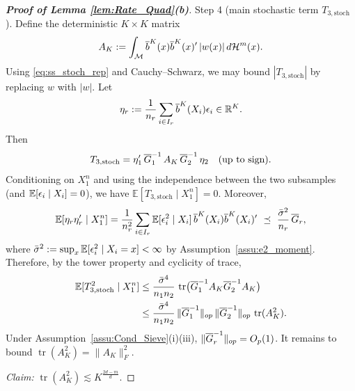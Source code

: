 \documentclass[12pt,american]{article}
\newcommand{\cH}{\mathcal{H}}
\DeclareMathOperator{\tr}{tr}
\theoremstyle{definition}
\theoremstyle{plain}
\theoremstyle{definition}
\theoremstyle{plain}
\theoremstyle{plain}
\theoremstyle{plain}
\theoremstyle{plain}
\theoremstyle{plain}
\newcommand{\R}{\mathbb{R}}
\newcommand{\E}{\mathbb{E}}
\begin{document}
\begin{proof}[\textbf{Proof of Lemma \ref{lem:Rate_Quad}(b)}]
\smallskip
\noindent Step 4 (main stochastic term $T_{3,\mathrm{stoch}}$).
Define the deterministic $K\times K$ matrix
\[
A_K:=\int_{\cM}\ol b^K(x)\ol b^K(x)'\,|w(x)|\,d\cH^m(x).
\]
Using \eqref{eq:ss_stoch_rep} and Cauchy--Schwarz, we may bound $|T_{3,\mathrm{stoch}}|$ by replacing $w$ with $|w|$.
Let
\[
\eta_r:=\frac1{n_r}\sum_{i\in I_r}\ol b^K(X_i)\e_i\in\R^{K}.
\]
Then
\begin{equation}
\label{eq:ss_T3stoch_matrix}
T_{3,\mathrm{stoch}}=\eta_1'\,\overline{G}_1^{-1}\,A_K\,\overline{G}_2^{-1}\,\eta_2\quad\text{(up to sign)}.
\end{equation}
Conditioning on $X_1^n$ and using the independence between the two subsamples (and $\E[\e_i\mid X_i]=0$), we have $\E[T_{3,\mathrm{stoch}}\mid X_1^n]=0$.
Moreover,
\[
\E[\eta_r\eta_r'\mid X_1^n]
=\frac1{n_r^2}\sum_{i\in I_r}\E[\e_i^2\mid X_i]\,\ol b^K(X_i)\ol b^K(X_i)'
\ \preceq\ \frac{\bar\s^2}{n_r}\,\ol G_r,
\]
where $\bar\s^2:=\sup_x\E[\e_i^2\mid X_i=x]<\infty$ by Assumption~\ref{assu:e2_moment}.
Therefore, by the tower property and cyclicity of trace,
\begin{align*}
\E[T_{3,\mathrm{stoch}}^2\mid X_1^n]
&\le \frac{\bar\s^4}{n_1n_2}\,\tr\!\big(\ol G_1^{-1}A_K\ol G_2^{-1}A_K\big)\\
&\le \frac{\bar\s^4}{n_1n_2}\,\|\ol G_1^{-1}\|_{op}\,\|\ol G_2^{-1}\|_{op}\,\tr(A_K^2).
\end{align*}
Under Assumption~\ref{assu:Cond_Sieve}(i)(iii), $\|\overline{G}_r^{-1}\|_{op}=O_p(1)$.
It remains to bound $\tr(A_K^2)=\|A_K\|_F^2$.

\smallskip
\noindent\emph{Claim:} $\tr(A_K^2)\lesssim K^{\frac{2d-m}{d}}$.


\end{proof}
\end{document}
